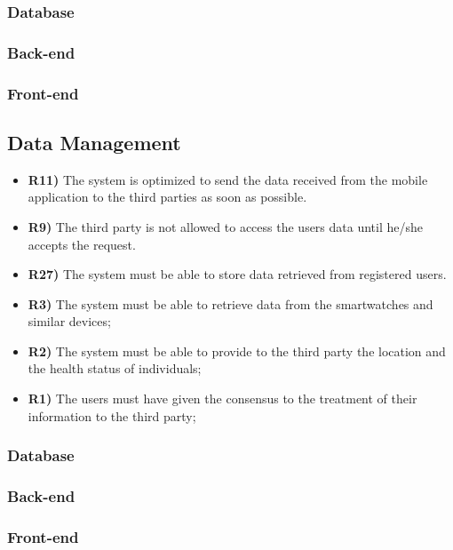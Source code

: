 \subsubsection*{Database}


\subsubsection*{Back-end}


\subsubsection*{Front-end}


\subsection{Data Management}
\begin{itemize}	
	\item {\color{Green}\textbf{R11)}} The system is optimized to send the data received from the mobile application to the third parties as soon as possible.
	\item {\color{Green}\textbf{R9)}} The third party is not allowed to access the users data until he/she accepts the request.
	\item {\color{Green}\textbf{R27)}} The system must be able to store data retrieved from registered users.
	\item {\color{Red}\textbf{R3)}} The system must be able to retrieve data from the smartwatches and similar devices;
	\item {\color{Green}\textbf{R2)}} The system must be able to provide to the third party the location and the health status of individuals;
	\item {\color{Green}\textbf{R1)}} The users must have given the consensus to the treatment of their information to the third party;
\end{itemize}

\subsubsection*{Database}


\subsubsection*{Back-end}


\subsubsection*{Front-end}


